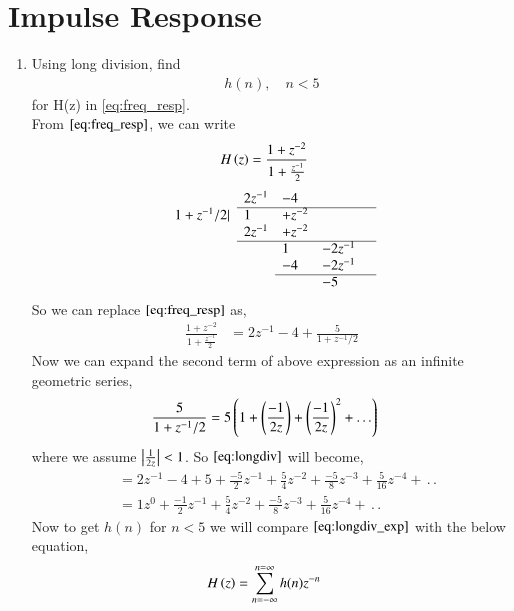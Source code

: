 \documentclass[journal,12pt,twocolumn]{IEEEtran}
\renewcommand\thesection{\arabic{section}}
\begin{document}
\section{Impulse Response}
  \begin{enumerate}[label=\thesection.\arabic*]
    \item Using long division, 
find
		\begin{align}
			h(n), \quad n < 5
		\end{align}
		for H(z) in 
		\eqref{eq:freq_resp}.\\
    \solution From $\eqref{eq:freq_resp}$, we can write
	  \begin{align}
		H\left(z\right) &= \frac{1 + z^{-2}}{1 + \frac{z^{-1}}{2}}
	  \end{align}
    $$
\begin{array}{llllll}
& 2z^{-1} & -4 \\\cline{2-5}
1 + z^{-1}/2 | & 1& +z^{-2}  \\
& 2z^{-1} & +z^{-2}  \\\cline{2-5}
& & 1 & -2z^{-1} \\
& & -4 & -2z^{-1} & \\\cline{3-5}
& & & -5 \\
\end{array}
$$
So we can replace $\eqref{eq:freq_resp}$ as, 
   \begin{align}
     \frac{1+z^{-2}}{1 + \frac{z^{-1}}{2}} &= 2z^{-1} - 4 + \frac{5}{1 + z^{-1}/2}\label{eq:longdiv}
   \end{align}
   Now we can expand the second term of above expression as an infinite geometric series,
   \begin{align}
     \frac{5}{1+z^{-1}/2} &= 5\left(1 + \left(\frac{-1}{2z}\right) + \left(\frac{-1}{2z}\right)^2 + .\,.\,.\right) \end{align}
     where we assume $\left\vert\frac{1}{2z}\right\vert < 1$.
    So $\eqref{eq:longdiv}$ will become,
    \begin{align}
      &= 2z^{-1} - 4 + 5 + \frac{-5}{2}z^{-1} + \frac{5}{4}z^{-2} + \frac{-5}{8}z^{-3} + \frac{5}{16}z^{-4} + \,.\,.\\
      &= 1z^{0} + \frac{-1}{2}z^{-1} +\frac{5}{4}z^{-2} + \frac{-5}{8}z^{-3} +\frac{5}{16}z^{-4} + \,.\,.  \label{eq:longdiv_exp}
    \end{align}
   Now to get $h(n)$ for $n <5$ we will compare $\eqref{eq:longdiv_exp}$ with the below equation,
    \begin{align}
      H\left(z\right) &= \sum_{n = -\infty}^{n = \infty}h(n)z^{-n}
    \end{align}

\end{enumerate}
\end{document}

